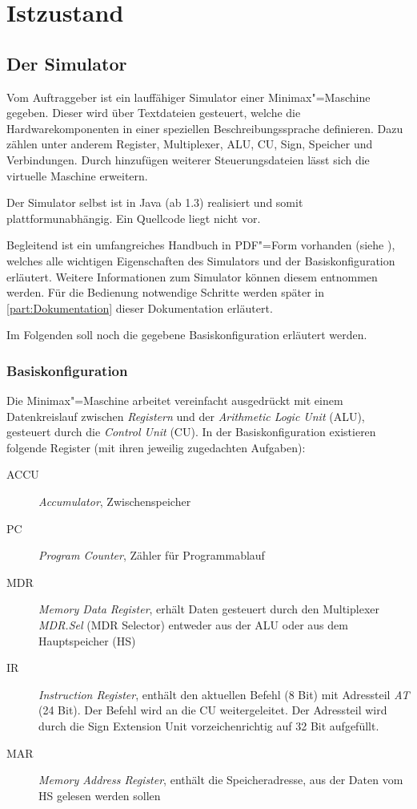 \chapter{Istzustand}
\label{chapter:Pflichtenheft-Istzustand}

\section{Der Simulator}
\label{section:Pflichtenheft-Istzustand-Simulator}

Vom Auftraggeber ist ein lauffähiger Simulator einer Minimax"=Maschine gegeben. Dieser wird über Textdateien gesteuert, welche die Hardwarekomponenten in einer speziellen Beschreibungssprache definieren. Dazu zählen unter anderem Register, Multiplexer, ALU, CU, Sign, Speicher und Verbindungen. Durch hinzufügen weiterer Steuerungsdateien lässt sich die virtuelle Maschine erweitern.

Der Simulator selbst ist in Java (ab 1.3) realisiert und somit plattformunabhängig. Ein Quellcode liegt nicht vor.

Begleitend ist ein umfangreiches Handbuch in PDF"=Form vorhanden (siehe \cite{minimax-handbuch}), welches alle wichtigen Eigenschaften des Simulators und der Basiskonfiguration erläutert. Weitere Informationen zum Simulator können diesem entnommen werden. Für die Bedienung notwendige Schritte werden später in \autoref{part:Dokumentation} dieser Dokumentation erläutert.

Im Folgenden soll noch die gegebene Basiskonfiguration erläutert werden.

\subsection{Basiskonfiguration}
\label{subsection:Pflichtenheft-Istzustand-Simulator-Basiskonfiguration}

Die Minimax"=Maschine arbeitet vereinfacht ausgedrückt mit einem Datenkreislauf zwischen \emph{Registern} und der \emph{Arithmetic Logic Unit} (ALU), gesteuert durch die \emph{Control Unit} (CU). In der Basiskonfiguration existieren folgende Register (mit ihren jeweilig zugedachten Aufgaben):

\begin{description}
    \item[ACCU] \emph{Accumulator}, Zwischenspeicher
    \item[PC] \emph{Program Counter}, Zähler für Programmablauf
    \item[MDR] \emph{Memory Data Register}, erhält Daten gesteuert durch den Multiplexer \emph{MDR.Sel} (MDR Selector) entweder aus der ALU oder aus dem Hauptspeicher (HS)
    \item[IR] \emph{Instruction Register}, enthält den aktuellen Befehl (8 Bit) mit Adressteil \emph{AT} (24 Bit). Der Befehl wird an die CU weitergeleitet. Der Adressteil wird durch die Sign Extension Unit vorzeichenrichtig auf 32 Bit aufgefüllt.
    \item[MAR] \emph{Memory Address Register}, enthält die Speicheradresse, aus der Daten vom HS gelesen werden sollen
\end{description}

